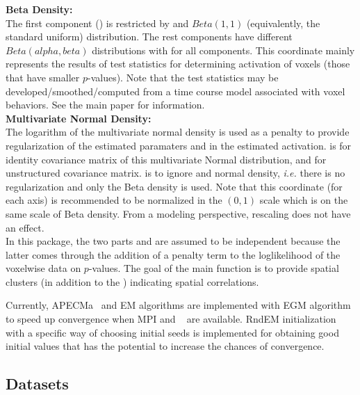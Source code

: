 {\bf Beta Density:}\\
The first component ()
is restricted by  and $Beta(1, 1)$ (equivalently,
the standard uniform) distribution. The rest  components have different 
$Beta(alpha, beta)$ distributions with  for all
 components.
This coordinate mainly represents the results of test statistics
for determining activation of voxels (those that have smaller $p$-values).
Note that the test statistics may be developed/smoothed/computed
from a time course model associated with voxel behaviors.
See the main paper \citet{ChenMaitra2018} for information.
\\

{\bf Multivariate Normal Density:}\\
The logarithm of the multivariate normal density is used as a penalty
to provide regularization of the estimated paramaters and in the
estimated activation. 
 is for identity covariance matrix of this
multivariate Normal 
distribution, and  for unstructured covariance matrix.
 is to ignore  and normal density,
{\em i.e.} there is no regularization and only the Beta density is used.
Note that this coordinate (for each axis) is recommended to be
normalized in the $(0, 1)$ scale which is on the same scale of Beta
density. From a modeling perspective, rescaling  does not
have an effect. 
\\

In this package, the two parts  and  are
assumed to be independent because the latter comes through the
addition of a penalty term to the loglikelihood of the voxelwise data on
$p$-values. %
The goal of the main function is to provide spatial
clusters (in addition to the ) indicating spatial correlations.

Currently, APECMa~\citep{Chen2011}
and EM algorithms are implemented with EGM algorithm~\citep{Chen2013}
to speed up convergence when MPI and ~\citep{Chen2012}
are available.
RndEM initialization~\citep{Maitra2009} with a specific way of choosing
initial seeds is implemented for obtaining
good initial values that has the potential to increase the chances of
convergence. 


\subsection[Datasets]{Datasets}

